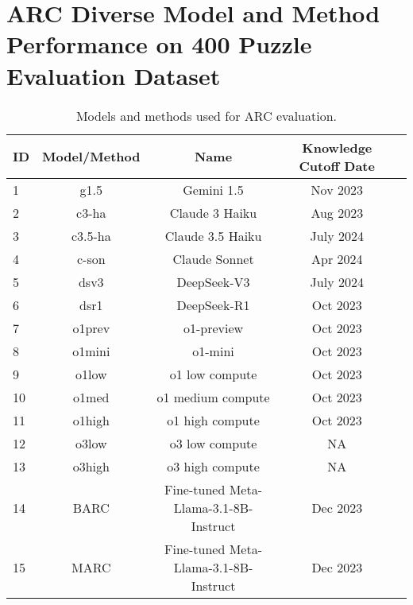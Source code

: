 \section{ARC Diverse Model and Method Performance on 400 Puzzle Evaluation Dataset}
\label{appendix:R}

\begin{table}[h]
\caption{Models and methods used for ARC evaluation.}
\label{tab:arc_models_methods}
\vskip 0.15in
\begin{center}
\begin{scriptsize}
\begin{sc}
\begin{tabular}{lcccr}
\toprule
ID & Model/Method & Name & Knowledge Cutoff Date\\
\midrule
1 & g1.5 & Gemini 1.5 &  Nov 2023 &\\
2 & c3-ha & Claude 3 Haiku& Aug 2023 \\
3 & c3.5-ha & Claude 3.5 Haiku & July 2024 \\
4 & c-son & Claude Sonnet & Apr 2024 \\
5 & dsv3 & DeepSeek-V3 & July 2024\\
6 & dsr1 & DeepSeek-R1 & Oct 2023 \\
7 & o1prev & o1-preview & Oct 2023 \\
8 & o1mini & o1-mini & Oct 2023 \\
9 & o1low & o1 low compute& Oct 2023 \\
10 & o1med & o1 medium compute & Oct 2023 \\
11 & o1high & o1 high compute & Oct 2023 \\
12 & o3low & o3 low compute & NA \\
13 & o3high & o3 high compute & NA \\
14 & BARC & Fine-tuned Meta-Llama-3.1-8B-Instruct & Dec 2023 \\
15 & MARC & Fine-tuned Meta-Llama-3.1-8B-Instruct & Dec 2023 \\
\bottomrule
\end{tabular}
\end{sc}
\end{scriptsize}
\end{center}
\vskip -0.1in
\end{table}


